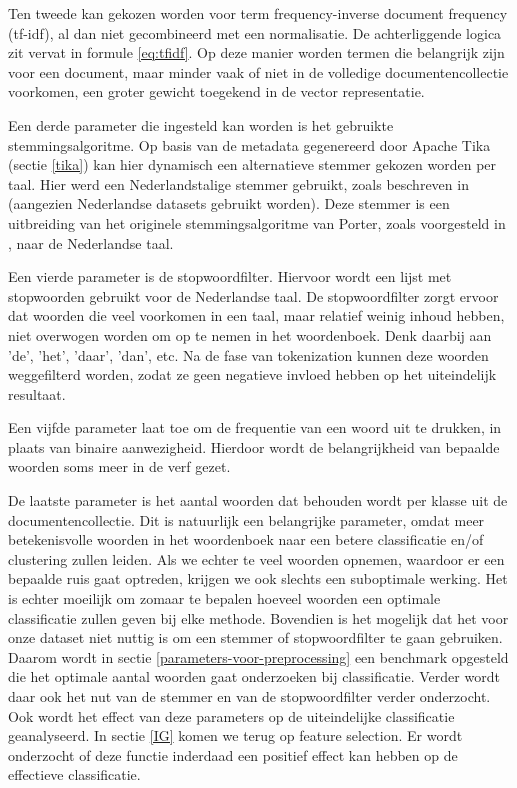 Ten tweede kan gekozen worden voor term frequency-inverse document frequency (tf-idf), al dan niet gecombineerd met een normalisatie. De achterliggende logica zit vervat in formule \ref{eq:tfidf}. Op deze manier worden termen die belangrijk zijn voor een document, maar minder vaak of niet in de volledige documentencollectie voorkomen, een groter gewicht toegekend in de vector representatie. 

Een derde parameter die ingesteld kan worden is het gebruikte stemmingsalgoritme.  Op basis van de metadata gegenereerd door Apache Tika (sectie \ref{tika}) kan hier dynamisch een alternatieve stemmer gekozen worden per taal. Hier werd een Nederlandstalige stemmer gebruikt, zoals beschreven in \cite{Kraaij1994} (aangezien Nederlandse datasets gebruikt worden). Deze stemmer is een uitbreiding van het originele stemmingsalgoritme van Porter, zoals voorgesteld in \cite{Porter1980}, naar de Nederlandse taal. 

Een vierde parameter is de stopwoordfilter. Hiervoor wordt een lijst met stopwoorden gebruikt voor de Nederlandse taal. De stopwoordfilter zorgt ervoor dat woorden die veel voorkomen in een taal, maar relatief weinig inhoud hebben, niet overwogen worden om op te nemen in het woordenboek. Denk daarbij aan 'de', 'het', 'daar', 'dan', etc. Na de fase van tokenization kunnen deze woorden weggefilterd worden, zodat ze geen negatieve invloed hebben op het uiteindelijk resultaat.

Een vijfde parameter laat toe om de frequentie van een woord uit te drukken, in plaats van binaire aanwezigheid. Hierdoor wordt de belangrijkheid van bepaalde woorden soms meer in de verf gezet.

De laatste parameter is het aantal woorden dat behouden wordt per klasse uit de documentencollectie. Dit is natuurlijk een belangrijke parameter, omdat meer betekenisvolle woorden in het woordenboek naar een betere classificatie en/of clustering zullen leiden. Als we echter te veel woorden opnemen, waardoor er een bepaalde ruis gaat optreden, krijgen we ook slechts een suboptimale werking. Het is echter moeilijk om zomaar te bepalen hoeveel woorden een optimale classificatie zullen geven bij elke methode. Bovendien is het mogelijk dat het voor onze dataset niet nuttig is om een stemmer of stopwoordfilter te gaan gebruiken. Daarom wordt in sectie \ref{parameters-voor-preprocessing} een benchmark opgesteld die het optimale aantal woorden gaat onderzoeken bij classificatie. Verder wordt daar ook het nut van de stemmer en van de stopwoordfilter verder onderzocht. Ook wordt het effect van deze parameters op de uiteindelijke classificatie geanalyseerd. 
In sectie \ref{IG} komen we terug op feature selection. Er wordt onderzocht of deze functie inderdaad een positief effect kan hebben op de effectieve classificatie.

